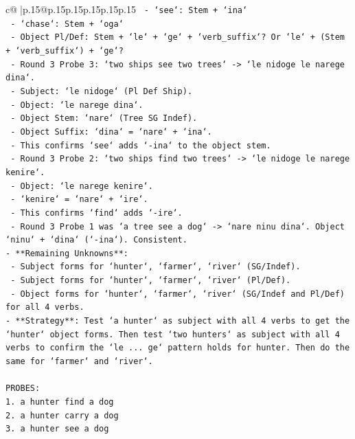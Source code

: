 \documentclass{article}
\begin{document}
{\begin{supertabular}{c@{$\;$}|p{.15\linewidth}@{}p{.15\linewidth}p{.15\linewidth}p{.15\linewidth}p{.15\linewidth}p{.15\linewidth}}
{{{\texttt{    {-} `see`: Stem + `ina`} \\
\texttt{    {-} `chase`: Stem + `oga`} \\
\texttt{  {-} Object Pl/Def: Stem + `le` + `ge` + `verb\_suffix`? Or `le` + (Stem + `verb\_suffix`) + `ge`?} \\
\texttt{    {-} Round 3 Probe 3: `two ships see two trees` {-}> `le nidoge le narege dina`.} \\
\texttt{      {-} Subject: `le nidoge` (Pl Def Ship).} \\
\texttt{      {-} Object: `le narege dina`.} \\
\texttt{      {-} Object Stem: `nare` (Tree SG Indef).} \\
\texttt{      {-} Object Suffix: `dina` = `nare` + `ina`.} \\
\texttt{      {-} This confirms `see` adds `{-}ina` to the object stem.} \\
\texttt{    {-} Round 3 Probe 2: `two ships find two trees` {-}> `le nidoge le narege kenire`.} \\
\texttt{      {-} Object: `le narege kenire`.} \\
\texttt{      {-} `kenire` = `nare` + `ire`.} \\
\texttt{      {-} This confirms `find` adds `{-}ire`.} \\
\texttt{    {-} Round 3 Probe 1 was `a tree see a dog` {-}> `nare ninu dina`. Object `ninu` + `dina` (`{-}ina`). Consistent.} \\
\texttt{{-} **Remaining Unknowns**:} \\
\texttt{  {-} Subject forms for `hunter`, `farmer`, `river` (SG/Indef).} \\
\texttt{  {-} Subject forms for `hunter`, `farmer`, `river` (Pl/Def).} \\
\texttt{  {-} Object forms for `hunter`, `farmer`, `river` (SG/Indef and Pl/Def) for all 4 verbs.} \\
\texttt{{-} **Strategy**: Test `a hunter` as subject with all 4 verbs to get the `hunter` object forms. Then test `two hunters` as subject with all 4 verbs to confirm the `le ... ge` pattern holds for hunter. Then do the same for `farmer` and `river`.} \\
\\ 
\texttt{PROBES:} \\
\texttt{1. a hunter find a dog} \\
\texttt{2. a hunter carry a dog} \\
\texttt{3. a hunter see a dog} \\
}}}
\end{supertabular}}
\end{document}
